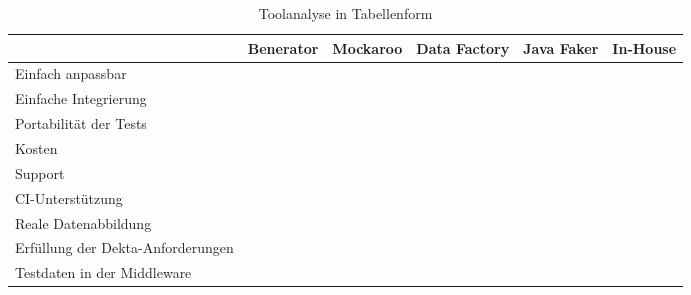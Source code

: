 \begin{sidewaystable}[h!p]
    \begin{center}
        \begin{tabular}{| >{\raggedright\arraybackslash}m{16em} | >{\raggedright\arraybackslash}m{6em} | >{\raggedright\arraybackslash}m{6em} | >{\raggedright\arraybackslash}m{6em} | >{\raggedright\arraybackslash}m{6em} | >{\raggedright\arraybackslash}m{6em} |}
            \hline
              & Benerator & Mockaroo & Data Factory & Java Faker & In-House \\ 
             \hline\hline
             Einfach anpassbar & \cellcolor{good} & \cellcolor{good} & \cellcolor{good} & \cellcolor{good} & \cellcolor{good} \\ 
             \hline
             Einfache Integrierung & \cellcolor{neutral} & \cellcolor{good} & \cellcolor{good} & \cellcolor{good} & \cellcolor{good} \\ 
             \hline
             Portabilität der Tests & \cellcolor{neutral} & \cellcolor{neutral} & \cellcolor{bad} & \cellcolor{bad} & \cellcolor{good} \\ 
             \hline
             Kosten & \cellcolor{good} & \cellcolor{neutral} & \cellcolor{good} & \cellcolor{good} & \cellcolor{neutral} \\ 
             \hline
             Support & \cellcolor{neutral} & \cellcolor{neutral} & \cellcolor{bad} & \cellcolor{neutral} & \cellcolor{neutral} \\ 
             \hline
             \ac{CI}-Unterstützung & \cellcolor{good} & \cellcolor{good} & \cellcolor{good} & \cellcolor{good} & \cellcolor{good} \\ 
             \hline
             Reale Datenabbildung & \cellcolor{good} & \cellcolor{good} & \cellcolor{neutral} & \cellcolor{neutral} & \cellcolor{good} \\ 
             \hline
             Erfüllung der Dekta-Anforderungen & \cellcolor{bad} & \cellcolor{bad} & \cellcolor{bad} & \cellcolor{bad} & \cellcolor{good} \\ 
             \hline
             Testdaten in der Middleware & \cellcolor{good} & \cellcolor{good} & \cellcolor{good} & \cellcolor{good} & \cellcolor{good} \\ 
             \hline
        \end{tabular}
        \caption{Toolanalyse in Tabellenform}\label{tab:toolanalyse}
    \end{center}
\end{sidewaystable}

